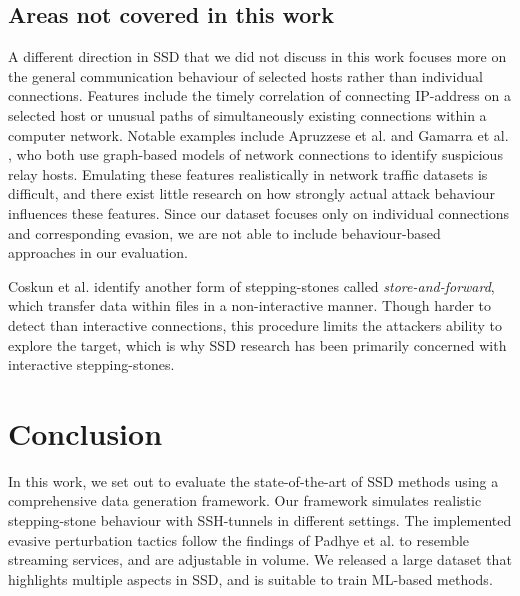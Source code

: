 \documentclass[runningheads,11pt]{llncs}\usepackage[]{graphicx}\usepackage[]{color}
\begin{document}




\subsection{Areas not covered in this work}

A different direction in SSD that we did not discuss in this work focuses more on the general communication behaviour of selected hosts rather than individual connections. Features include the timely correlation of connecting IP-address on a selected host or unusual paths of simultaneously existing connections within a computer network. Notable examples include Apruzzese et al. \cite{apruzzese2017detection} and Gamarra et al. \cite{gamarra2018analysis}, who both use graph-based models of network connections to identify suspicious relay hosts.
Emulating these features realistically in network traffic datasets is difficult, and there exist little research on how strongly actual attack behaviour influences these features. Since our dataset focuses only on individual connections and corresponding evasion, we are not able to include behaviour-based approaches in our evaluation.

Coskun et al. \cite{coskun2007efficient} identify another form of stepping-stones called \textit{store-and-forward}, which transfer data within files in a non-interactive manner. Though harder to detect than interactive connections, this procedure limits the attackers ability to explore the target, which is why SSD research has been primarily concerned with interactive stepping-stones.


\section{Conclusion}

In this work, we set out to evaluate the state-of-the-art of SSD methods using a comprehensive data generation framework. Our framework simulates realistic stepping-stone behaviour with SSH-tunnels in different  settings. The implemented evasive perturbation tactics follow the findings of Padhye et al. \cite{padhye2010evading} to resemble streaming services, and are adjustable in volume. We released a large dataset that highlights multiple aspects in SSD, and is suitable to train ML-based methods. 
\end{document}
